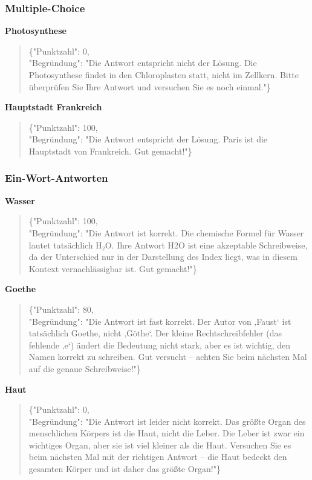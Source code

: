 \documentclass[a4paper,12pt]{article}
\begin{document}
\subsubsection{Multiple-Choice}

\textbf{Photosynthese}
\begin{quote}
\{"Punktzahl": 0,\\
"Begründung": "Die Antwort entspricht nicht der Lösung. Die Photosynthese findet in den Chloroplasten statt, nicht im Zellkern. Bitte überprüfen Sie Ihre Antwort und versuchen Sie es noch einmal."\}
\end{quote}

\textbf{Hauptstadt Frankreich}
\begin{quote}
\{"Punktzahl": 100,\\
"Begründung": "Die Antwort entspricht der Lösung. Paris ist die Hauptstadt von Frankreich. Gut gemacht!"\}
\end{quote}

\subsubsection{Ein-Wort-Antworten}

\textbf{Wasser}
\begin{quote}
\{"Punktzahl": 100,\\
"Begründung": "Die Antwort ist korrekt. Die chemische Formel für Wasser lautet tatsächlich H₂O. Ihre Antwort H2O ist eine akzeptable Schreibweise, da der Unterschied nur in der Darstellung des Index liegt, was in diesem Kontext vernachlässigbar ist. Gut gemacht!"\}
\end{quote}

\textbf{Goethe}
\begin{quote}
\{"Punktzahl": 80,\\
"Begründung": "Die Antwort ist fast korrekt. Der Autor von ‚Faust‘ ist tatsächlich Goethe, nicht ‚Göthe‘. Der kleine Rechtschreibfehler (das fehlende ‚e‘) ändert die Bedeutung nicht stark, aber es ist wichtig, den Namen korrekt zu schreiben. Gut versucht – achten Sie beim nächsten Mal auf die genaue Schreibweise!"\}
\end{quote}

\textbf{Haut}
\begin{quote}
\{"Punktzahl": 0,\\
"Begründung": "Die Antwort ist leider nicht korrekt. Das größte Organ des menschlichen Körpers ist die Haut, nicht die Leber. Die Leber ist zwar ein wichtiges Organ, aber sie ist viel kleiner als die Haut. Versuchen Sie es beim nächsten Mal mit der richtigen Antwort – die Haut bedeckt den gesamten Körper und ist daher das größte Organ!"\}
\end{quote}
\end{document}
